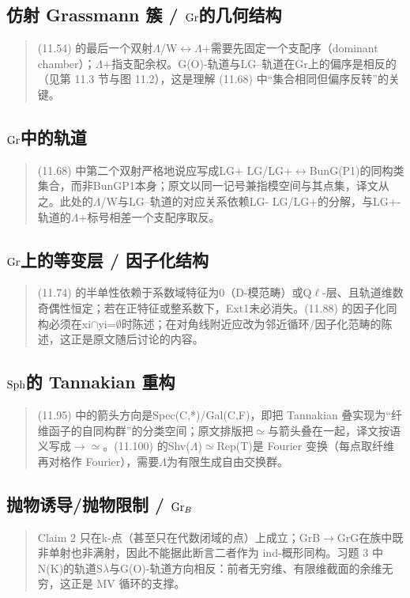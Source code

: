 \subsection*{仿射 Grassmann 簇 / $\mathrm{Gr}$的几何结构}
\begin{quote}\small
(11.54) 的最后一个双射$\Lambda$/W$\leftrightarrow$$\Lambda$+需要先固定一个支配序（dominant chamber）；$\Lambda$+指支配余权。G(O)-轨道与LG--轨道在Gr上的偏序是相反的（见第 11.3 节与图 11.2），这是理解 (11.68) 中“集合相同但偏序反转”的关键。
\end{quote}

\subsection*{$\mathrm{Gr}$中的轨道}
\begin{quote}\small
(11.68) 中第二个双射严格地说应写成LG+ LG/LG+$\leftrightarrow$BunG(P1)的同构类集合，而非BunGP1本身；原文以同一记号兼指模空间与其点集，译文从之。此处的$\Lambda$/W与LG--轨道的对应关系依赖LG- LG/LG+的分解，与LG+-轨道的$\Lambda$+标号相差一个支配序取反。
\end{quote}

\subsection*{$\mathrm{Gr}$上的等变层 / 因子化结构}
\begin{quote}\small
(11.74) 的半单性依赖于系数域特征为0（D-模范畴）或Q$\ell$-层、且轨道维数奇偶性恒定；若在正特征或整系数下，Ext1未必消失。(11.88) 的因子化同构必须在xi$\cap$yi=$\emptyset$时陈述；在对角线附近应改为邻近循环/因子化范畴的陈述，这正是原文随后讨论的内容。
\end{quote}

\subsection*{$\mathrm{Sph}$的 Tannakian 重构}
\begin{quote}\small
(11.95) 中的箭头方向是Spec(C,*)/Gal(C,F)，即把 Tannakian 叠实现为“纤维函子的自同构群”的分类空间；原文排版把$\simeq$与箭头叠在一起，译文按语义写成$\to$$\simeq$。(11.100) 的Shv($\Lambda$)$\simeq$Rep(T)是 Fourier 变换（每点取纤维再对格作 Fourier），需要$\Lambda$为有限生成自由交换群。
\end{quote}

\subsection*{抛物诱导/抛物限制 / $\mathrm{Gr}_B$}
\begin{quote}\small
Claim 2 只在k-点（甚至只在代数闭域的点）上成立；GrB$\to$GrG在族中既非单射也非满射，因此不能据此断言二者作为 ind-概形同构。习题 3 中N(K)的轨道S$\lambda$与G(O)-轨道方向相反：前者无穷维、有限维截面的余维无穷，这正是 MV 循环的支撑。
\end{quote}

